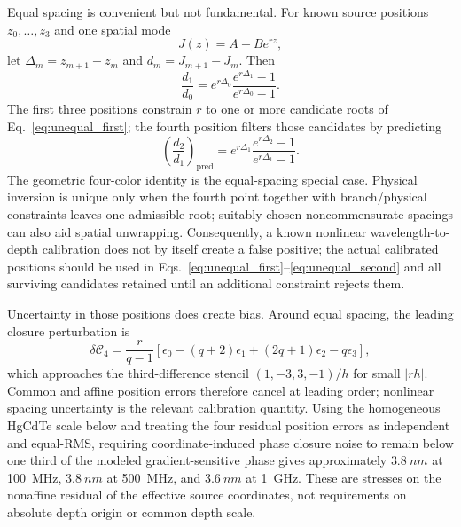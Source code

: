 \documentclass[11pt]{article}
\newcommand{\Cfour}{\mathcal{C}_4}
\begin{document}
Equal spacing is convenient but not fundamental. For known source positions $z_0,\ldots,z_3$ and one spatial mode
\begin{equation}
J(z)=A+B e^{rz},
\end{equation}
let $\Delta_m=z_{m+1}-z_m$ and $d_m=J_{m+1}-J_m$. Then
\begin{equation}
\boxed{
\frac{d_1}{d_0}
=e^{r\Delta_0}
\frac{e^{r\Delta_1}-1}{e^{r\Delta_0}-1}.}
\label{eq:unequal_first}
\end{equation}
The first three positions constrain $r$ to one or more candidate roots of Eq.~\eqref{eq:unequal_first}; the fourth position filters those candidates by predicting
\begin{equation}
\boxed{
\left(\frac{d_2}{d_1}\right)_{\mathrm{pred}}
=e^{r\Delta_1}
\frac{e^{r\Delta_2}-1}{e^{r\Delta_1}-1}.}
\label{eq:unequal_second}
\end{equation}
The geometric four-color identity is the equal-spacing special case. Physical inversion is unique only when the fourth point together with branch/physical constraints leaves one admissible root; suitably chosen noncommensurate spacings can also aid spatial unwrapping. Consequently, a known nonlinear wavelength-to-depth calibration does not by itself create a false positive; the actual calibrated positions should be used in Eqs.~\eqref{eq:unequal_first}--\eqref{eq:unequal_second} and all surviving candidates retained until an additional constraint rejects them.

Uncertainty in those positions does create bias. Around equal spacing, the leading closure perturbation is
\begin{equation}
\delta\Cfour
=\frac{r}{q-1}\left[\epsilon_0-(q+2)\epsilon_1+(2q+1)\epsilon_2-q\epsilon_3\right],
\end{equation}
which approaches the third-difference stencil $(1,-3,3,-1)/h$ for small $|rh|$. Common and affine position errors therefore cancel at leading order; nonlinear spacing uncertainty is the relevant calibration quantity. Using the homogeneous HgCdTe scale below and treating the four residual position errors as independent and equal-RMS, requiring coordinate-induced phase closure noise to remain below one third of the modeled gradient-sensitive phase gives approximately $3.8~\si{nm}$ at \SI{100}{MHz}, $3.8~\si{nm}$ at \SI{500}{MHz}, and $3.6~\si{nm}$ at \SI{1}{GHz}. These are stresses on the nonaffine residual of the effective source coordinates, not requirements on absolute depth origin or common depth scale.
\end{document}
